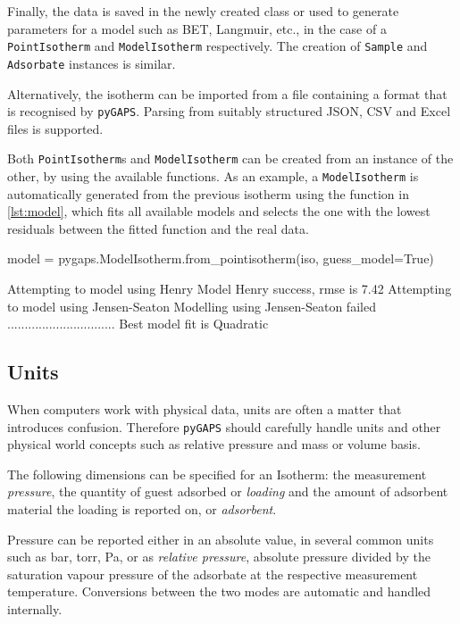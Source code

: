 Finally, the data is saved in the newly created class or used to
generate parameters for a model such as \gls{BET}, Langmuir, etc.,
in the case of a \texttt{PointIsotherm} and
\texttt{ModelIsotherm} respectively. The creation of
\texttt{Sample} and \texttt{Adsorbate} instances is similar.

Alternatively, the isotherm can be imported from a file containing 
a format that is recognised by \texttt{pyGAPS}. Parsing from 
suitably structured JSON, CSV and Excel files is supported.

Both \texttt{PointIsotherm}s and \texttt{ModelIsotherm} can
be created from an instance of the other, by using the 
available functions. As an example, a \texttt{ModelIsotherm} is automatically
generated from the previous isotherm using the function in
\autoref{lst:model}, which fits all available models and selects
the one with the lowest residuals between the fitted function
and the real data.

\begin{python}[caption={Guessing the best model},label={lst:model}]
model = pygaps.ModelIsotherm.from_pointisotherm(iso, guess_model=True)
\end{python}
\begin{pythonout}
Attempting to model using Henry
Model Henry success, rmse is 7.42
Attempting to model using Jensen-Seaton
Modelling using Jensen-Seaton failed
...............................
Best model fit is Quadratic
\end{pythonout}

\subsection{Units}

When computers work with physical data, units are often a matter 
that introduces confusion. Therefore \texttt{pyGAPS} should
carefully handle units and other physical world concepts such as relative
pressure and mass or volume basis.

The following dimensions can be specified for an Isotherm: 
the measurement \textit{pressure}, the quantity of guest adsorbed
or \textit{loading} and the amount of adsorbent material
the loading is reported on, or \textit{adsorbent}.

Pressure can be reported either in an absolute value, in several 
common units such as \si{\bar}, torr, \si{\pascal}, or as 
\textit{relative pressure}, absolute pressure divided by the 
saturation vapour pressure of the adsorbate at the respective
measurement temperature. Conversions between the two modes are 
automatic and handled internally.

